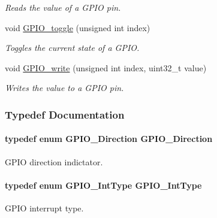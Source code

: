 \begin{DoxyCompactItemize}
\begin{DoxyCompactList}\small\item\em Reads the value of a G\-P\-I\-O pin. \end{DoxyCompactList}\item 
void \hyperlink{_g_p_i_o_8h_a5653fbc35078d9140ede8afef074d878}{G\-P\-I\-O\-\_\-toggle} (unsigned int index)
\begin{DoxyCompactList}\small\item\em Toggles the current state of a G\-P\-I\-O. \end{DoxyCompactList}\item 
void \hyperlink{_g_p_i_o_8h_ab561efc784812728c819decc5e9d85af}{G\-P\-I\-O\-\_\-write} (unsigned int index, uint32\-\_\-t value)
\begin{DoxyCompactList}\small\item\em Writes the value to a G\-P\-I\-O pin. \end{DoxyCompactList}\end{DoxyCompactItemize}


\subsubsection{Typedef Documentation}
\paragraph[{G\-P\-I\-O\-\_\-\-Direction}]{\setlength{\rightskip}{0pt plus 5cm}typedef enum {\bf G\-P\-I\-O\-\_\-\-Direction}  {\bf G\-P\-I\-O\-\_\-\-Direction}}\label{_g_p_i_o_8h_aa0ecedf7ce14ed787c307c4da0715223}


G\-P\-I\-O direction indictator. 

\paragraph[{G\-P\-I\-O\-\_\-\-Int\-Type}]{\setlength{\rightskip}{0pt plus 5cm}typedef enum {\bf G\-P\-I\-O\-\_\-\-Int\-Type}  {\bf G\-P\-I\-O\-\_\-\-Int\-Type}}\label{_g_p_i_o_8h_a4aacf71cd31c688c4a6d449989c7cbc6}


G\-P\-I\-O interrupt type. 


